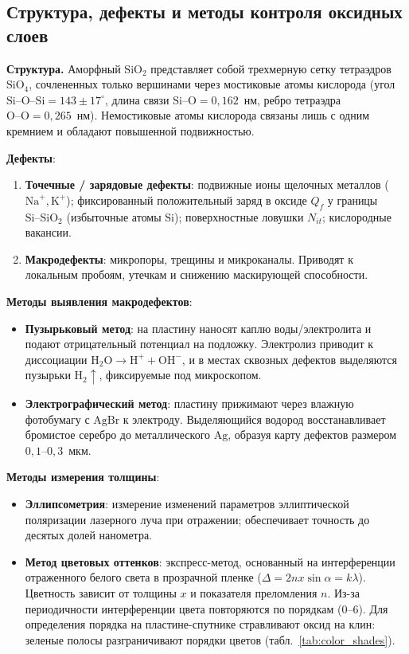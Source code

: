 \documentclass[12pt,a4paper]{article}
\theoremstyle{plain}
\theoremstyle{definition}
\theoremstyle{remark}
\numberwithin{equation}{section}
\begin{document}
\subsection{Структура, дефекты и методы контроля оксидных слоев}

\textbf{Структура.} Аморфный $\mathrm{SiO}_2$ представляет собой трехмерную сетку тетраэдров $\mathrm{SiO}_4$, сочлененных только вершинами через мостиковые атомы кислорода (угол $\mathrm{Si\text{--}O\text{--}Si} = 143 \pm 17^\circ$, длина связи $\mathrm{Si\text{--}O} = 0{,}162$~нм, ребро тетраэдра $\mathrm{O\text{--}O} = 0{,}265$~нм). Немостиковые атомы кислорода связаны лишь с одним кремнием и обладают повышенной подвижностью.

\textbf{Дефекты}:
\begin{enumerate}
    \item \textbf{Точечные / зарядовые дефекты}: подвижные ионы щелочных металлов ($\mathrm{Na}^+, \mathrm{K}^+$); фиксированный положительный заряд в оксиде $Q_f$ у границы $\mathrm{Si}\text{--}\mathrm{SiO}_2$ (избыточные атомы $\mathrm{Si}$); поверхностные ловушки $N_{it}$; кислородные вакансии.
    \item \textbf{Макродефекты}: микропоры, трещины и микроканалы. Приводят к локальным пробоям, утечкам и снижению маскирующей способности.
\end{enumerate}

\textbf{Методы выявления макродефектов}:
\begin{itemize}
    \item \textbf{Пузырьковый метод}: на пластину наносят каплю воды/электролита и подают отрицательный потенциал на подложку. Электролиз приводит к диссоциации $\mathrm{H}_2\mathrm{O} \to \mathrm{H}^+ + \mathrm{OH}^-$, и в местах сквозных дефектов выделяются пузырьки $\mathrm{H}_2\uparrow$, фиксируемые под микроскопом.
    \item \textbf{Электрографический метод}: пластину прижимают через влажную фотобумагу с $\mathrm{AgBr}$ к электроду. Выделяющийся водород восстанавливает бромистое серебро до металлического $\mathrm{Ag}$, образуя карту дефектов размером $0{,}1\text{--}0{,}3$~мкм.
\end{itemize}

\textbf{Методы измерения толщины}:
\begin{itemize}
    \item \textbf{Эллипсометрия}: измерение изменений параметров эллиптической поляризации лазерного луча при отражении; обеспечивает точность до десятых долей нанометра.
    \item \textbf{Метод цветовых оттенков}: экспресс-метод, основанный на интерференции отраженного белого света в прозрачной пленке ($\Delta = 2 n x \sin\alpha = k\lambda$). Цветность зависит от толщины $x$ и показателя преломления $n$. Из-за периодичности интерференции цвета повторяются по порядкам ($0\text{--}6$). Для определения порядка на пластине-спутнике стравливают оксид на клин: зеленые полосы разграничивают порядки цветов (табл.~\ref{tab:color_shades}).
\end{itemize}
\end{document}
